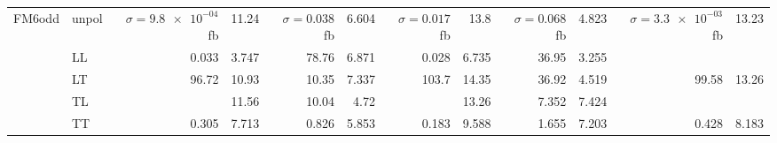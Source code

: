 \begin{table}[h]
{\begin{tabular}{llrrrrrrrrrr}
\midrule
\multirow{5}{*}{FM6odd}
 & unpol & $\sigma = \num{9.8e-04}$ fb & \num{11.24} & $\sigma = \num{0.038}$ fb & \num{6.604} & $\sigma = \num{0.017}$ fb & \num{13.8} & $\sigma = \num{0.068}$ fb & \num{4.823} & $\sigma = \num{3.3e-03}$ fb & \num{13.23} \\
 & LL & \num{0.033} & \num{3.747} & \num{78.76} & \num{6.871} & \num{0.028} & \num{6.735} & \num{36.95} & \num{3.255} &  &  \\
 & LT & \num{96.72} & \num{10.93} & \num{10.35} & \num{7.337} & \num{103.7} & \num{14.35} & \num{36.92} & \num{4.519} & \num{99.58} & \num{13.26} \\
 & TL &  & \num{11.56} & \num{10.04} & \num{4.72} &  & \num{13.26} & \num{7.352} & \num{7.424} &  &  \\
 & TT & \num{0.305} & \num{7.713} & \num{0.826} & \num{5.853} & \num{0.183} & \num{9.588} & \num{1.655} & \num{7.203} & \num{0.428} & \num{8.183} \\
\bottomrule
\end{tabular}
}%
\end{table}